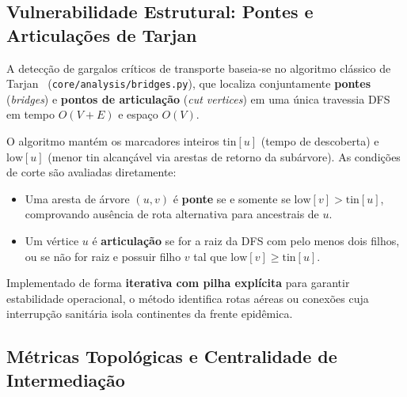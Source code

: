 \documentclass[11pt]{article}
\begin{document}
\subsection{Vulnerabilidade Estrutural: Pontes e Articulações de Tarjan}

A detecção de gargalos críticos de transporte baseia-se no algoritmo clássico de Tarjan~\cite{tarjan1972} (\texttt{core/analysis/bridges.py}), que localiza conjuntamente \textbf{pontes} (\emph{bridges}) e \textbf{pontos de articulação} (\emph{cut vertices}) em uma única travessia DFS em tempo $O(V + E)$ e espaço $O(V)$.

O algoritmo mantém os marcadores inteiros $\mathrm{tin}[u]$ (tempo de descoberta) e $\mathrm{low}[u]$ (menor $\mathrm{tin}$ alcançável via arestas de retorno da subárvore). As condições de corte são avaliadas diretamente:
\begin{itemize}
  \item Uma aresta de árvore $(u, v)$ é \textbf{ponte} se e somente se $\mathrm{low}[v] > \mathrm{tin}[u]$, comprovando ausência de rota alternativa para ancestrais de $u$.
  \item Um vértice $u$ é \textbf{articulação} se for a raiz da DFS com pelo menos dois filhos, ou se não for raiz e possuir filho $v$ tal que $\mathrm{low}[v] \ge \mathrm{tin}[u]$.
\end{itemize}
Implementado de forma \textbf{iterativa com pilha explícita} para garantir estabilidade operacional, o método identifica rotas aéreas ou conexões cuja interrupção sanitária isola continentes da frente epidêmica.

\subsection{Métricas Topológicas e Centralidade de Intermediação}
\end{document}
